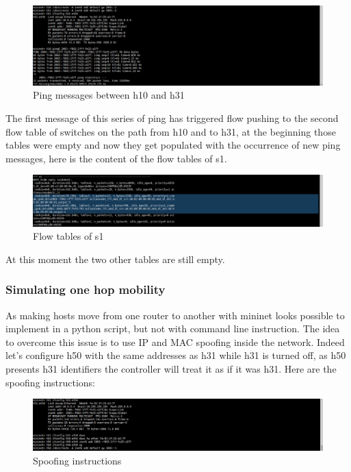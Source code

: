 \documentclass{article}
\begin{document}
\begin{figure}[h!]
  \centering
    \includegraphics[trim = 0mm 0mm 237mm 0mm,clip,scale=0.5]{reportPictures/h10_ping_h31.png}
  \caption{Ping messages between h10 and h31}
\end{figure}


The first message of this series of ping has triggered flow pushing to
the second flow table of switches on the path from h10 and to h31, at
the beginning those tables were empty and now they get populated with
the occurrence of new ping messages, here is the content of the flow
tables of s1.

\begin{figure}[h!]
  \centering
    \includegraphics[trim = 0mm 0mm 237mm 0mm,clip,scale=0.5]{reportPictures/s10_dumpflows.png}
  \caption{Flow tables of s1}
\end{figure}

At this moment the two other tables are still empty.

\subsubsection{Simulating one hop mobility}

As making hosts move from one router to another with mininet looks
possible to implement in a python script, but not with command line
instruction. The idea to overcome this issue is to use IP and MAC
spoofing inside the network. Indeed let's configure h50 with the same
addresses as h31 while h31 is turned off, as h50 presents h31
identifiers the controller will treat it as if it was h31.
Here are the spoofing instructions: 

\begin{figure}[h!]
  \centering
    \includegraphics[trim = 0mm 0mm 237mm 0mm,clip,scale=0.5]{reportPictures/h50_spoofs_h31.png}
  \caption{Spoofing instructions}
\end{figure}
\end{document}
